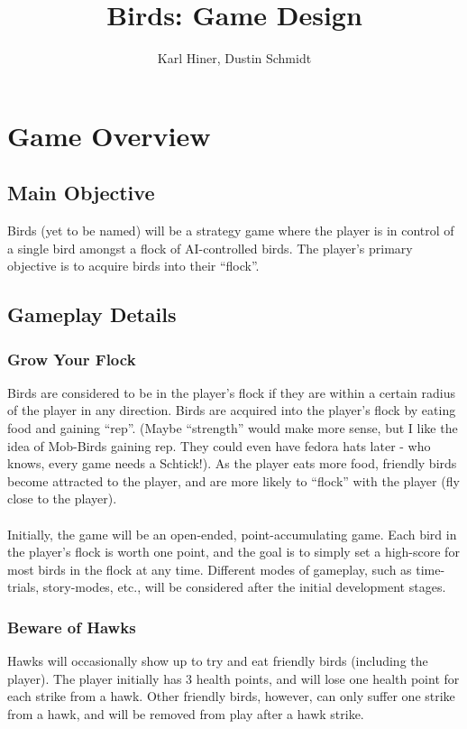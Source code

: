 \documentclass{article}
\begin{document}
\title{Birds: Game Design}
\author{Karl Hiner, Dustin Schmidt}
\maketitle

\section*{Game Overview}
\subsection*{Main Objective}
Birds (yet to be named) will be a strategy game where the player is in control of a single bird amongst a flock of AI-controlled birds.  The player's primary objective is to acquire birds into their ``flock''.
\subsection*{Gameplay Details}
\subsubsection*{Grow Your Flock}
Birds are considered to be in the player's flock if they are within a certain radius of the player in any direction.  Birds are acquired into the player's flock by eating food and gaining ``rep''. (Maybe ``strength'' would make more sense, but I like the idea of Mob-Birds gaining rep.  They could even have fedora hats later - who knows, every game needs a Schtick!).  As the player eats more food, friendly birds become attracted to the player, and are more likely to ``flock'' with the player (fly close to the player).
\\\\
Initially, the game will be an open-ended, point-accumulating game.  Each bird in the player's flock is worth one point, and the goal is to simply set a high-score for most birds in the flock at any time.  Different modes of gameplay, such as time-trials, story-modes, etc., will be considered after the initial development stages.

\subsubsection*{Beware of Hawks}
Hawks will occasionally show up to try and eat friendly birds (including the player).  The player initially has 3 health points, and will lose one health point for each strike from a hawk.  Other friendly birds, however, can only suffer one strike from a hawk, and will be removed from play after a hawk strike.
\end{document}
